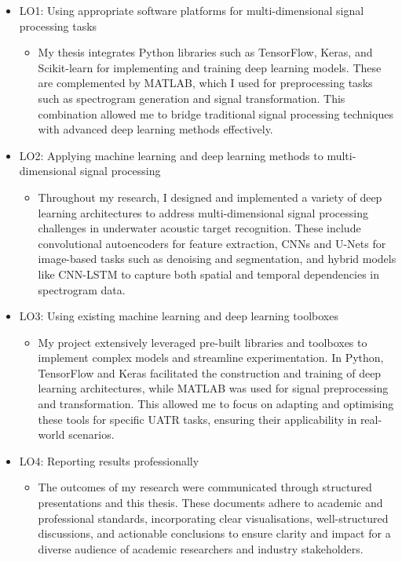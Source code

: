 \begin{itemize}
    \item LO1: Using appropriate software platforms for multi-dimensional signal processing tasks
    \begin{itemize}
        \item My thesis integrates Python libraries such as TensorFlow, Keras, and Scikit-learn for implementing and training deep learning models. These are complemented by MATLAB, which I used for preprocessing tasks such as spectrogram generation and signal transformation. This combination allowed me to bridge traditional signal processing techniques with advanced deep learning methods effectively.
    \end{itemize}
    \item LO2: Applying machine learning and deep learning methods to multi-dimensional signal processing
    \begin{itemize}
        \item Throughout my research, I designed and implemented a variety of deep learning architectures to address multi-dimensional signal processing challenges in underwater acoustic target recognition. These include convolutional autoencoders for feature extraction, CNNs and U-Nets for image-based tasks such as denoising and segmentation, and hybrid models like CNN-LSTM to capture both spatial and temporal dependencies in spectrogram data.
    \end{itemize}
    \item LO3: Using existing machine learning and deep learning toolboxes
    \begin{itemize}
        \item My project extensively leveraged pre-built libraries and toolboxes to implement complex models and streamline experimentation. In Python, TensorFlow and Keras facilitated the construction and training of deep learning architectures, while MATLAB was used for signal preprocessing and transformation. This allowed me to focus on adapting and optimising these tools for specific UATR tasks, ensuring their applicability in real-world scenarios.
    \end{itemize}
    \item LO4: Reporting results professionally
    \begin{itemize}
        \item The outcomes of my research were communicated through structured presentations and this thesis. These documents adhere to academic and professional standards, incorporating clear visualisations, well-structured discussions, and actionable conclusions to ensure clarity and impact for a diverse audience of academic researchers and industry stakeholders.
    \end{itemize}
\end{itemize}